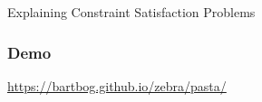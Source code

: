 \documentclass{beamer}
\newcommand\m[1]{\ensuremath{#1}\xspace}
\newcommand\allconstraints{\m{T_P}}
\begin{document}
\begin{frame}{\small{Explaining Constraint Satisfaction Problems}}
    \frametitle{Demo}

    \begin{center}
        {\Large \url{https://bartbog.github.io/zebra/pasta/}}
    \end{center}
    

\end{frame}



\end{document}
